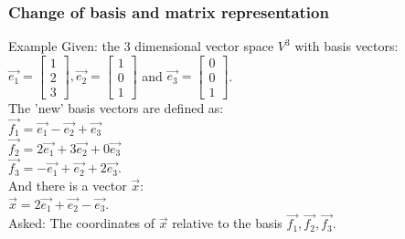 \begin{frame}
	\frametitle{Change of basis and matrix representation}
	\begin{block}{Example}
		Given: the 3 dimensional vector space $V^3$ with basis vectors: \\
		$\overrightarrow{e_1}=\begin{bmatrix}
		1\\2\\3
		\end{bmatrix}, \overrightarrow{e_2}=\begin{bmatrix} 1\\0\\1 \end{bmatrix}$ and $\overrightarrow{e_3}=\begin{bmatrix} 0\\0\\1 \end{bmatrix}$.\\
		The 'new' basis vectors are defined as:\\
		$\overrightarrow{f_1}=\overrightarrow{e_1}-\overrightarrow{e_2}+\overrightarrow{e_3}$\\
		$\overrightarrow{f_2}=2\overrightarrow{e_1}+3\overrightarrow{e_2}+0\overrightarrow{e_3}$\\
		$\overrightarrow{f_3}=-\overrightarrow{e_1}+\overrightarrow{e_2}+2\overrightarrow{e_3}$.\\
		And there is a vector $\overrightarrow{x}$:\\
		$\overrightarrow{x}=2\overrightarrow{e_1}+\overrightarrow{e_2}-\overrightarrow{e_3}$.\\ \vspace{4mm}
		Asked: The coordinates of $	\overrightarrow{x}$ relative to the basis $\overrightarrow{f_1}, \overrightarrow{f_2}, \overrightarrow{f_3}$. 
	\end{block}
\end{frame}

